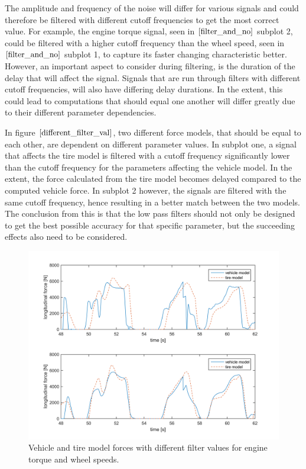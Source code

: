 The amplitude and frequency of the noise will differ for various signals and could therefore  be filtered with different cutoff frequencies to get the most correct value. For example, the engine torque signal, seen in $ \ref{filter_and_no} $ subplot 2, could be filtered with a higher cutoff frequency than the wheel speed, seen in $ \ref{filter_and_no} $ subplot 1, to capture its faster changing characteristic better. However, an important aspect to consider during filtering, is the duration of the delay that will affect the signal. Signals that are run through filters with different cutoff frequencies, will also have differing delay durations. In the extent, this could lead to computations that should equal one another will differ greatly due to their different parameter dependencies. 

In figure $ \ref{different_filter_val} $, two different force models, that should be equal to each other, are dependent on different parameter values. In subplot one, a signal that affects the tire model is filtered with a cutoff frequency significantly lower than the cutoff frequency for the parameters affecting the vehicle model. In the extent, the force calculated from the tire model becomes delayed compared to the computed vehicle force. In subplot 2 however, the signals are filtered with the same cutoff frequency, hence resulting in a better match between the two models. The conclusion from this is that the low pass filters should not only be designed to get the best possible accuracy for that specific parameter, but the succeeding effects also need to be considered.

\begin{figure}[h]
	\centering
	\includegraphics[width=1.0\textwidth]{Pictures/different_filter_val}
	\caption {Vehicle and tire model forces with different filter values for engine torque and wheel speeds.}
	\label{different_filter_val}
\end{figure}

